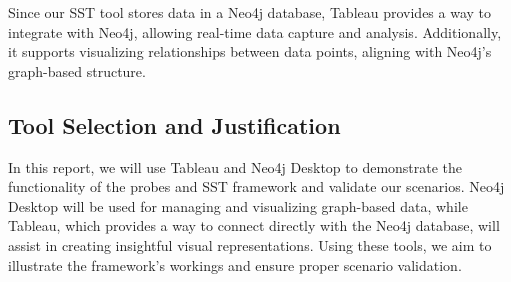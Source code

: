 Since our SST tool stores data in a Neo4j database, Tableau provides a way to integrate with Neo4j, allowing real-time data capture and analysis. Additionally, it supports visualizing relationships between data points, aligning with Neo4j's graph-based structure.

\subsection{Tool Selection and Justification}

In this report, we will use Tableau and Neo4j Desktop to demonstrate the functionality of the probes and SST framework and validate our scenarios. Neo4j Desktop will be used for managing and visualizing graph-based data, while Tableau, which provides a way to connect directly with the Neo4j database, will assist in creating insightful visual representations. Using these tools, we aim to illustrate the framework's workings and ensure proper scenario validation.







